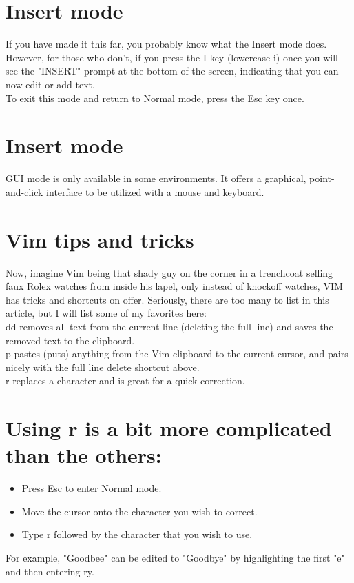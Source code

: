 \documentclass{article}
\begin{document}
\section*{Insert mode}
If you have made it this far, you probably know what the Insert mode does. However, for those who don't, if you press the I key (lowercase i) once you will see the "INSERT" prompt at the bottom of the screen, indicating that you can now edit or add text.\\
To exit this mode and return to Normal mode, press the Esc key once.\\ 

\section*{Insert mode}
GUI mode is only available in some environments. It offers a graphical, point-and-click interface to be utilized with a mouse and keyboard.\\

\section*{Vim tips and tricks}
Now, imagine Vim being that shady guy on the corner in a trenchcoat selling faux Rolex watches from inside his lapel, only instead of knockoff watches, VIM has tricks and shortcuts on offer. Seriously, there are too many to list in this article, but I will list some of my favorites here:\\ 
    dd removes all text from the current line (deleting the full line) and saves the removed text to the clipboard.\\ 
    p pastes (puts) anything from the Vim clipboard to the current cursor, and pairs nicely with the full line delete shortcut above.\\ 
    r replaces a character and is great for a quick correction.\\

\section*{Using r is a bit more complicated than the others:}
\begin{itemize}
    \item Press Esc to enter Normal mode.
   \item  Move the cursor onto the character you wish to correct.
   \item  Type r followed by the character that you wish to use.
\end{itemize}
For example, "Goodbee" can be edited to "Goodbye" by highlighting the first "e" and then entering ry.
\end{document}
